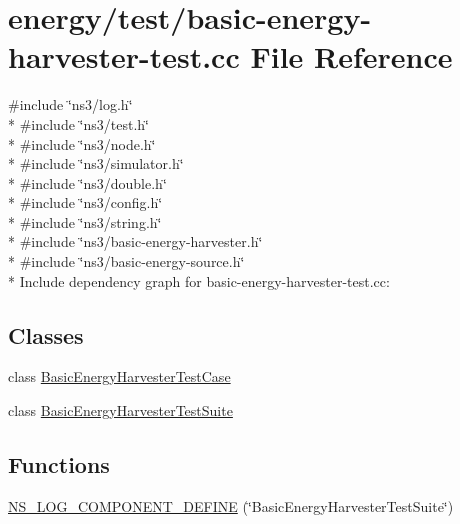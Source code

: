 \hypertarget{basic-energy-harvester-test_8cc}{}\section{energy/test/basic-\/energy-\/harvester-\/test.cc File Reference}
\label{basic-energy-harvester-test_8cc}
{\ttfamily \#include \char`\"{}ns3/log.\+h\char`\"{}}\\*
{\ttfamily \#include \char`\"{}ns3/test.\+h\char`\"{}}\\*
{\ttfamily \#include \char`\"{}ns3/node.\+h\char`\"{}}\\*
{\ttfamily \#include \char`\"{}ns3/simulator.\+h\char`\"{}}\\*
{\ttfamily \#include \char`\"{}ns3/double.\+h\char`\"{}}\\*
{\ttfamily \#include \char`\"{}ns3/config.\+h\char`\"{}}\\*
{\ttfamily \#include \char`\"{}ns3/string.\+h\char`\"{}}\\*
{\ttfamily \#include \char`\"{}ns3/basic-\/energy-\/harvester.\+h\char`\"{}}\\*
{\ttfamily \#include \char`\"{}ns3/basic-\/energy-\/source.\+h\char`\"{}}\\*
Include dependency graph for basic-\/energy-\/harvester-\/test.cc\+:
\subsection*{Classes}
\begin{DoxyCompactItemize}
\item 
class \hyperlink{classBasicEnergyHarvesterTestCase}{Basic\+Energy\+Harvester\+Test\+Case}
\item 
class \hyperlink{classBasicEnergyHarvesterTestSuite}{Basic\+Energy\+Harvester\+Test\+Suite}
\end{DoxyCompactItemize}
\subsection*{Functions}
\begin{DoxyCompactItemize}
\item 
\hyperlink{basic-energy-harvester-test_8cc_ac3bccfd7aa8fa4cb71641539b83a82c4}{N\+S\+\_\+\+L\+O\+G\+\_\+\+C\+O\+M\+P\+O\+N\+E\+N\+T\+\_\+\+D\+E\+F\+I\+NE} (\char`\"{}Basic\+Energy\+Harvester\+Test\+Suite\char`\"{})
\end{DoxyCompactItemize}
